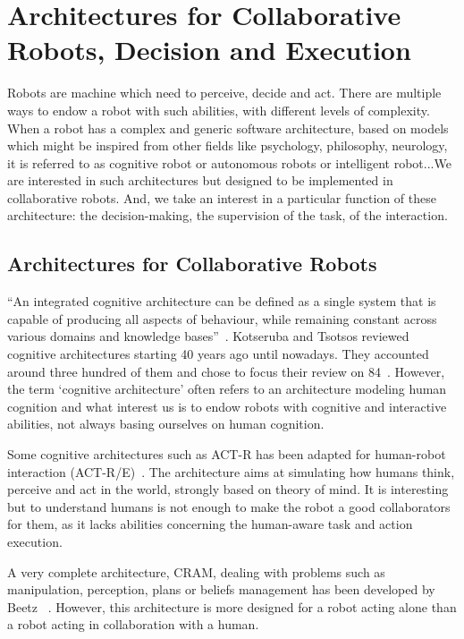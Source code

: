 \documentclass[a4paper,11pt,twoside]{StyleThese}
\begin{document}
\section{Architectures for Collaborative Robots, Decision and Execution}

Robots are machine which need to perceive, decide and act. There are multiple ways to endow a robot with such abilities, with different levels of complexity. When a robot has a complex and generic software architecture, based on models which might be inspired from other fields like psychology, philosophy, neurology, it is referred to as cognitive robot or autonomous robots or intelligent robot...We are interested in such architectures but designed to be implemented in collaborative robots. And, we take an interest in a particular function of these architecture: the decision-making, the supervision of the task, of the interaction.

\subsection{Architectures for Collaborative Robots}
``An integrated cognitive architecture can be defined as a single system that is capable of producing all aspects of behaviour, while remaining constant across various domains and knowledge bases''~\cite[p.~104]{chong_2007_integrated}. Kotseruba and Tsotsos reviewed cognitive architectures starting 40 years ago until nowadays. They accounted around three hundred of them and chose to focus their review on 84~\cite{kotseruba_2020_40}. However, the term \textquoteleft cognitive architecture\textquoteright{} often refers to an architecture modeling human cognition and what interest us is to endow robots with cognitive and interactive abilities, not always basing ourselves on human cognition.  

Some cognitive architectures such as ACT-R has been adapted for human-robot interaction (ACT-R/E)~\cite{trafton_2013_act}. The architecture aims at simulating how humans think, perceive and act in the world, strongly based on theory of mind. It is interesting but to understand humans is not enough to make the robot a good collaborators for them, as it lacks abilities concerning the human-aware task and action execution. 

A very complete architecture, CRAM, dealing with problems such as manipulation, perception, plans or beliefs management has been developed by Beetz \etal~\cite{beetz_2010_cram}. However, this architecture is more designed for a robot acting alone than a robot acting in collaboration with a human.
\end{document}

